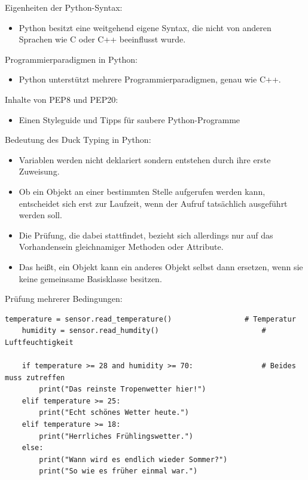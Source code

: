 \teilaufgabe
Eigenheiten der Python-Syntax:

\begin{itemize}
    \renewcommand{\labelitemi}{$\blacksquare$}
    \item Python besitzt eine weitgehend eigene Syntax, die nicht von anderen
    Sprachen wie C oder C++ beeinflusst wurde.
\end{itemize}

\teilaufgabe
Programmierparadigmen in Python:

\begin{itemize}
    \renewcommand{\labelitemi}{$\blacksquare$}
    \item Python unterstützt mehrere Programmierparadigmen, genau wie C++.
\end{itemize}

\teilaufgabe
Inhalte von PEP8 und PEP20:

\begin{itemize}
    \renewcommand{\labelitemi}{$\blacksquare$}
    \item Einen Styleguide und Tipps für saubere Python-Programme
\end{itemize}

\teilaufgabe
Bedeutung des \glqq{}Duck Typing\grqq{} in Python:

\begin{itemize}
    \renewcommand{\labelitemi}{$\blacksquare$}
    \item Variablen werden nicht deklariert sondern entstehen durch ihre erste Zuweisung.
    \item Ob ein Objekt an einer bestimmten Stelle aufgerufen werden kann, entscheidet sich erst zur Laufzeit,
    wenn der Aufruf tatsächlich ausgeführt werden soll.
    \item Die Prüfung, die dabei stattfindet, bezieht sich allerdings nur auf das Vorhandensein
    gleichnamiger Methoden oder Attribute.
    \item Das heißt, ein Objekt kann ein anderes Objekt selbst dann ersetzen,
    wenn sie keine gemeinsame Basisklasse besitzen.
\end{itemize}

\clearpage

\teilaufgabe
Prüfung mehrerer Bedingungen:

\begin{Verbatim}[gobble=4]
    temperature = sensor.read_temperature()                 # Temperatur
    humidity = sensor.read_humdity()                        # Luftfeuchtigkeit

    if temperature >= 28 and humidity >= 70:                # Beides muss zutreffen
        print("Das reinste Tropenwetter hier!")
    elif temperature >= 25:
        print("Echt schönes Wetter heute.")
    elif temperature >= 18:
        print("Herrliches Frühlingswetter.")
    else:
        print("Wann wird es endlich wieder Sommer?")
        print("So wie es früher einmal war.")

\end{Verbatim}

